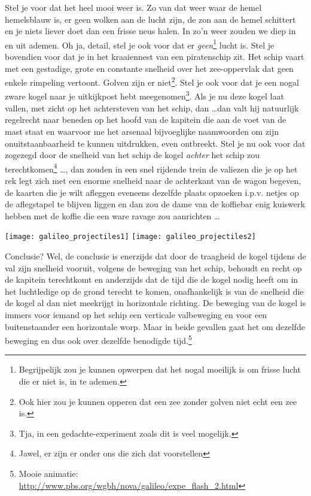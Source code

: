 \documentclass{ximera}
\begin{document}
	\author{Bart Lambregs}
    \xmsource



	
	Stel je voor dat het heel mooi weer is. Zo van dat weer waar de hemel hemelsblauw is, er geen wolken aan de lucht zijn, de zon aan de hemel schittert en je niets liever doet dan een frisse neus halen. In zo'n weer zouden we diep in en uit ademen. Oh ja, detail, stel je ook voor dat er \emph{geen}\footnote{Begrijpelijk zou je kunnen opwerpen dat het nogal moeilijk is om frisse lucht die er niet is, in te ademen.} lucht is. Stel je bovendien voor dat je in het kraaiennest van een piratenschip zit. Het schip vaart met een gestadige, grote en constante snelheid over het zee-oppervlak dat geen enkele rimpeling vertoont. Golven zijn er niet\footnote{Ook hier zou je kunnen opperen dat een zee zonder golven niet echt een zee is.}. Stel je ook voor dat je een nogal zware kogel naar je uitkijkpost hebt meegenomen\footnote{Tja, in een gedachte-experiment zoals dit is veel mogelijk.}. Als je nu deze kogel laat vallen, met zicht op het achtersteven van het schip, dan \ldots dan valt hij natuurlijk regelrecht naar beneden op het hoofd van de kapitein die aan de voet van de mast staat en waarvoor me het arsenaal bijvoeglijke naamwoorden om zijn onuitstaanbaarheid te kunnen uitdrukken, even ontbreekt. Stel je nu ook voor dat zogezegd door de snelheid van het schip de kogel \emph{achter} het schip zou terechtkomen\footnote{Jawel, er zijn er onder ons die zich dat voorstellen} \ldots, dan zouden in een snel rijdende trein de valiezen die je op het rek legt zich met een enorme snelheid naar de achterkant van de wagon begeven, de kaarten die je wilt afleggen eveneens dezelfde plaats opzoeken i.p.v. netjes op de  aflegstapel te blijven liggen en dan zou de dame van de koffiebar enig kuiswerk hebben met de koffie die een ware ravage zou aanrichten \ldots 
	\begin{image}
	
	\texttt{[image: galileo\_projectiles1]} 
	\texttt{[image: galileo\_projectiles2]} 
	\end{image}
	
	Conclusie? Wel, de conclusie is enerzijds dat door de traagheid de kogel tijdens de val zijn snelheid vooruit, volgens de beweging van het schip, behoudt en recht op de kapitein terechtkomt en anderzijds dat de tijd die de kogel nodig heeft om in het luchtledige op de grond terecht te komen, onafhankelijk is van de snelheid die de kogel al dan niet meekrijgt in horizontale richting. De beweging van de kogel is immers voor iemand op het schip een verticale valbeweging en voor een buitenstaander een horizontale worp. Maar in beide gevallen gaat het om dezelfde beweging en dus ook over dezelfde benodigde tijd.\footnote{Mooie animatie: \url{http://www.pbs.org/wgbh/nova/galileo/expe_flash_2.html}}
	
	
	
\end{document}

